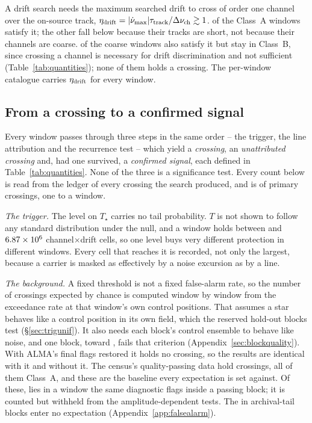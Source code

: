 A drift search needs the maximum searched drift to cross of order one channel
over the on-source track, $\eta_{\rm drift} = |\dot\nu_{\max}|\tau_{\rm
track}/\Delta\nu_{\rm ch} \gtrsim 1$. \EtaDriftAOk{} of the \NWinA{} Class~A
windows satisfy it; the other \EtaDriftALo{} fall below because their tracks
are short, not because their channels are coarse. \EtaDriftBHi{} of the
\NWinB{} coarse windows also satisfy it but stay in Class~B, since crossing a
channel is necessary for drift discrimination and not sufficient
(Table~\ref{tab:quantities}); none of them holds a crossing. The per-window
catalogue carries $\eta_{\rm drift}$ for every window.

\subsection{From a crossing to a confirmed signal}
\label{sec:summary}

Every window passes through three steps in the same order -- the trigger, the
line attribution and the recurrence test -- which yield a \emph{crossing}, an
\emph{unattributed crossing} and, had one survived, a \emph{confirmed signal},
each defined in Table~\ref{tab:quantities}. None of the three is a
significance test. Every count below is read from the ledger of every crossing
the search produced, and is of primary crossings, one to a window.

\emph{The trigger.} The level on $T_\star$ carries no tail probability. $T$ is
not shown to follow any standard distribution under the null, and a window
holds between \TuCellsLo{} and $6.87 \times 10^{6}$ channel$\times$drift cells, so one
level buys very different protection in different windows. Every cell that
reaches it is recorded, not only the largest, because a carrier is masked as
effectively by a noise excursion as by a line.

\emph{The background.} A fixed threshold is not a fixed false-alarm rate, so
the number of crossings expected by chance is computed window by window from
the exceedance rate at that window's own control positions. That assumes a
star behaves like a control position in its own field, which the reserved
hold-out blocks test (\S\ref{sec:trigunif}). It also needs each block's
control ensemble to behave like noise, and one block, \BqFailBlock{} toward
\BqFailStar, fails that criterion (Appendix~\ref{sec:blockquality}). With
ALMA's final flags restored it holds no crossing, so the results are identical
with it and without it. The census's quality-passing data hold \CsNCrossQp{} crossings, all
of them Class~A, and these are the baseline every expectation is set against.
Of these, \BkFlagNCrossOther{} lies in a window the same diagnostic flags inside
a passing block; it is counted but withheld from the amplitude-dependent
tests. The \CeNTailCrossWord{} in archival-tail blocks enter no expectation
(Appendix~\ref{app:falsealarm}).

